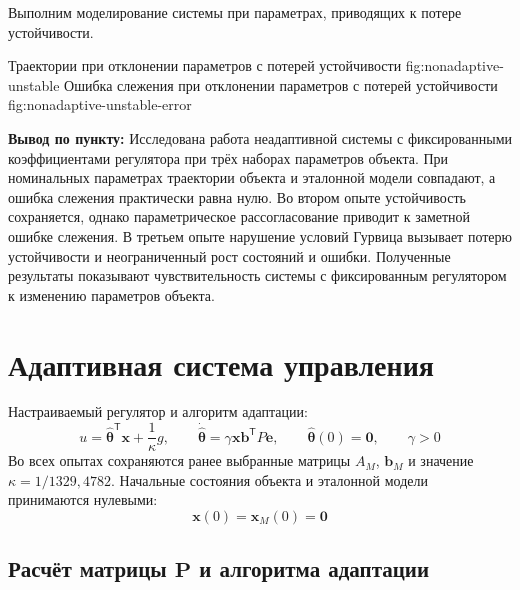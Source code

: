 Выполним моделирование системы при параметрах, приводящих к потере
устойчивости.

  {Траектории при отклонении параметров с потерей устойчивости}
  {fig:nonadaptive-unstable}
  {Ошибка слежения при отклонении параметров с потерей устойчивости}
  {fig:nonadaptive-unstable-error}

\noindent\textbf{Вывод по пункту:} Исследована работа неадаптивной системы с фиксированными коэффициентами регулятора при трёх наборах параметров объекта. При номинальных параметрах траектории объекта и эталонной модели совпадают, а ошибка слежения практически равна нулю. Во втором опыте устойчивость сохраняется, однако параметрическое рассогласование приводит к заметной ошибке слежения. В третьем опыте нарушение условий Гурвица вызывает потерю устойчивости и неограниченный рост состояний и ошибки. Полученные результаты показывают чувствительность системы с фиксированным регулятором к изменению параметров объекта.

\section{Адаптивная система управления}

Настраиваемый регулятор и алгоритм адаптации:
\begin{equation}
  u=\hat{\bm\theta}^{\mathsf T}\bm x+\frac{1}{\kappa}g,
  \qquad
  \dot{\hat{\bm\theta}}=\gamma\bm x\bm b^{\mathsf T}P\bm e,
  \qquad \hat{\bm\theta}(0)=\bm 0,
  \qquad \gamma>0
\end{equation}
Во всех опытах сохраняются ранее выбранные матрицы $A_M$, $\bm b_M$
и значение $\kappa=1/1329{,}4782$. Начальные состояния объекта
и эталонной модели принимаются нулевыми:
\begin{equation}
  \bm x(0)=\bm x_M(0)=\bm 0
\end{equation}

\subsection{Расчёт матрицы \texorpdfstring{$\bm P$}{P} и алгоритма адаптации}

